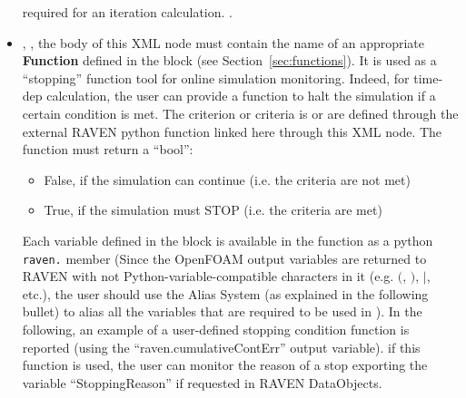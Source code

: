 \begin{itemize}
                                                            required for an iteration calculation. .
   \item {}, ,   the
                                                           body of this XML node must contain the name of an appropriate \textbf{Function} defined in the
                                                             block (see Section~\ref{sec:functions}).  It is used as a
                                                           ``stopping'' function tool for online simulation monitoring. Indeed, for time-dep calculation, the user can provide a
                                                            function to halt the simulation if a certain condition is
                                                            met. The criterion or criteria is or are defined through the external RAVEN python function linked here through this XML node. 
                                                            The function must return a ``bool'':
                                                            \begin{itemize}
                                                              \item False, if the simulation can continue (i.e. the criteria are not met)
                                                              \item True, if the simulation must STOP (i.e. the criteria are met)
                                                            \end{itemize}
                                                            Each variable defined in the  block is available in the
                                                            function as a python \texttt{raven.} member (\nb Since the OpenFOAM output variables are returned to RAVEN with not Python-variable-compatible characters in it (e.g. $($, $)$, $|$, etc.), 
                                                            the user should use the Alias System (as explained in the following bullet) to alias all the variables that are required to be used in ). 
                                                            In the following, an example of a
                                                            user-defined stopping condition function is reported (using the ``raven.cumulativeContErr'' output variable).
                                                            \nb if this function is used, the user can monitor the reason of a stop exporting the variable ``StoppingReason'' if requested in RAVEN DataObjects.
                                                            

\end{itemize}
